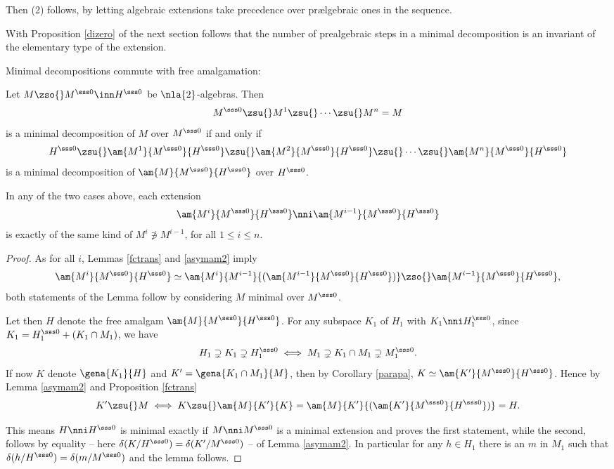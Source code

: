 Then (2) follows, by letting algebraic extensions take precedence over pr\ae{}lgebraic ones in the sequence.

With Proposition \ref{dizero} of the next section follows that the number of prealgebraic steps in a minimal decomposition
is an invariant of the elementary type of the extension.

\smallskip
Minimal decompositions commute with free amalgamation:
\begin{lem}\label{mindecamalg}
Let $M\zso{}M^{\sss 0}\inn H^{\sss 0}$ be $\nla{2}$-algebras.
Then $$M^{\sss 0}\zsu{}M^{1}\zsu{}\cdots\zsu{}M^{n}=M$$ is a minimal decomposition of $M$ over $M^{\sss 0}$ if and only if
$$H^{\sss 0}\zsu{}\am{M^{1}}{M^{\sss 0}}{H^{\sss 0}}\zsu{}\am{M^{2}}{M^{\sss 0}}{H^{\sss 0}}\zsu{}\cdots\zsu{}\am{M^{n}}{M^{\sss 0}}{H^{\sss 0}}$$%
is a minimal decomposition of $\am{M}{M^{\sss 0}}{H^{\sss 0}}$ over $H^{\sss 0}$.

In any of the two cases above, each extension $$\am{M^{i}}{M^{\sss 0}}{H^{\sss 0}}\nni \am{M^{i-1}}{M^{\sss 0}}{H^{\sss 0}}$$
is exactly of the same kind of $M^{i}\nni M^{i-1}$, for all $1\leq i\leq n$.
\end{lem}
\begin{proof}
As for all $i$, Lemmas \ref{fctrans} and \ref{asymam2} imply
$$\am{M^{i}}{M^{\sss 0}}{H^{\sss 0}}\simeq\am{M^{i}}{M^{i-1}}{(\am{M^{i-1}}{M^{\sss 0}}{H^{\sss 0}})}\zso{}\am{M^{i-1}}{M^{\sss 0}}{H^{\sss 0}},$$
both statements of the Lemma follow by %
considering $M$ minimal over $M^{\sss 0}$.

\smallskip
Let then $H$ denote the free amalgam $\am{M}{M^{\sss 0}}{H^{\sss 0}}$. For any subspace $K_{1}$ of $H_{1}$ with $K_{1}\nni H^{\sss 0}_{1}$, since
$K_{1}=H^{\sss 0}_{1}+(K_{1}\cap M_{1})$, we have
$$H_{1}\supsetneq K_{1}\supsetneq H^{\sss 0}_{1}\iff M_{1}\supsetneq K_{1}\cap M_{1}\supsetneq M^{\sss 0}_{1}.$$
If now $K$ denote $\gena{K_{1}}{H}$ and $K^{\prime}=\gena{K_{1}\cap M_{1}}{M}$, then by Corollary \ref{parapa},
$K\simeq\am{K^{\prime}}{M^{\sss 0}}{H^{\sss 0}}$. Hence by Lemma \ref{asymam2} and Proposition \ref{fctrans}
$$K^{\prime}\zsu{}M\iff K\zsu{}\am{M}{K^{\prime}}{K}=\am{M}{K^{\prime}}{(\am{K^{\prime}}{M^{\sss 0}}{H^{\sss 0}})}=H.$$

This means $H\nni H^{\sss 0}$ is minimal exactly if $M\nni M^{\sss 0}$ is a minimal extension and
proves the first statement, while the second, follows by equality  -- here
$\delta(K/H^{\sss 0})=\delta(K^{\prime}/M^{\sss 0})$ -- of Lemma \ref{asymam2}.%
In particular for any $h\in H_{1}$ there is an $m$ in $M_{1}$ such that $\delta(h/H^{\sss 0})=\delta(m/M^{\sss 0})$ and the lemma
follows.
\end{proof}

